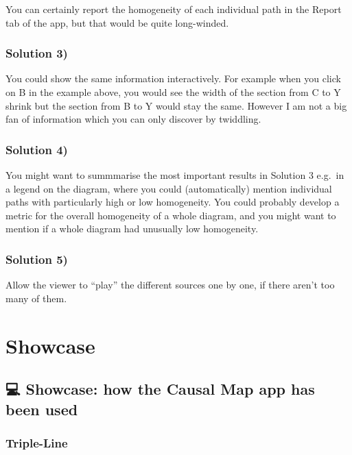 \documentclass[
]{book}
\begin{document}
You can certainly report the homogeneity of each individual path in the Report tab of the app, but that would be quite long-winded.

\hypertarget{solution-3}{%
\section{Solution 3)}\label{solution-3}}

You could show the same information interactively. For example when you click on B in the example above, you would see the width of the section from C to Y shrink but the section from B to Y would stay the same. However I am not a big fan of information which you can only discover by twiddling.

\hypertarget{solution-4}{%
\section{Solution 4)}\label{solution-4}}

You might want to summmarise the most important results in Solution 3 e.g.~in a legend on the diagram, where you could (automatically) mention individual paths with particularly high or low homogeneity. You could probably develop a metric for the overall homogeneity of a whole diagram, and you might want to mention if a whole diagram had unusually low homogeneity.

\hypertarget{solution-5}{%
\section{Solution 5)}\label{solution-5}}

Allow the viewer to ``play'' the different sources one by one, if there aren't too many of them.

\hypertarget{part-showcase}{%
\part{Showcase}\label{part-showcase}}

\hypertarget{showcase}{%
\chapter{💻 Showcase: how the Causal Map app has been used}\label{showcase}}

\hypertarget{triple-line}{%
\section{Triple-Line}\label{triple-line}}
\end{document}
